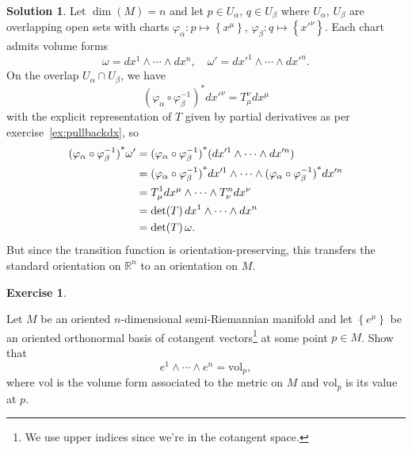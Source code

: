 \documentclass[11pt, a4paper]{report}
\theoremstyle{definition}
\newtheorem{exercise}{Exercise}[part]
\newtheorem{solution}{Solution}[part]
\newenvironment{ex}{\begin{exercise}}{\end{exercise}\pagebreak[1]}
\newenvironment{sol}{\begin{solution}}{\end{solution}\pagebreak[3]}
\renewcommand*{\d}{\ensuremath\mathop{}\mathopen{}d}
\begin{document}
\begin{sol}

Let $\dim(M) = n$ and let $p \in U_\alpha$, $q \in U_\beta$ where $U_\alpha$, $U_\beta$ are overlapping open sets with charts $\varphi_\alpha: p \mapsto \left\{x^\mu\right\}$, $\varphi_\beta: q \mapsto \left\{x'^\nu\right\}$. Each chart admits volume forms
\[
    \omega = dx^1 \wedge \cdots \wedge dx^n, \quad
    \omega' = dx'^1 \wedge \cdots \wedge dx'^n.
\]
On the overlap $U_\alpha \cap U_\beta$, we have
\[
{(\varphi_\alpha \circ \varphi_\beta^{-1})}^* dx'^\nu = T_\mu^\nu dx^\mu
\]
with the explicit representation of $T$ given by partial derivatives as per exercise~\ref{ex:pullbackdx}, so
\begin{align*}
    {(\varphi_\alpha \circ \varphi_\beta^{-1})}^* \omega' &= {(\varphi_\alpha \circ \varphi_\beta^{-1})}^* (dx'^1 \wedge \cdots \wedge dx'^n) \\
        &= {(\varphi_\alpha \circ \varphi_\beta^{-1})}^* dx'^1 \wedge \cdots \wedge {(\varphi_\alpha \circ \varphi_\beta^{-1})}^* dx'^n \\
        &= T_\mu^1 dx^\mu \wedge \cdots \wedge T_\nu^n dx^\nu \\
        &= \det(T) \d x^1 \wedge \cdots \wedge dx^n \\
        &= \det(T) \, \omega.
\end{align*}
But since the transition function is orientation-preserving, this transfers the standard orientation on $\mathbb{R}^n$ to an orientation on $M$.

\end{sol}

\begin{ex}\label{ex:canonicalvolumeform}

Let $M$ be an oriented $n$-dimensional semi-Riemannian manifold and let $\left\{e^\mu\right\}$ be an oriented orthonormal basis of cotangent vectors\footnote{We use upper indices since we're in the cotangent space.} at some point $p \in M$. Show that
\[
    e^1 \wedge \cdots \wedge e^n = \text{vol}_p,
\]
where $\text{vol}$ is the volume form associated to the metric on $M$ and $\text{vol}_p$ is its value at $p$.

\end{ex}
\end{document}
